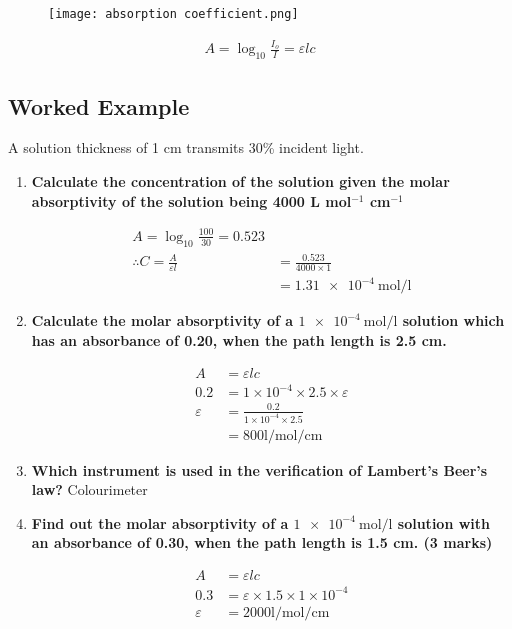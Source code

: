 	\begin{figure}[H]
		\centering
		\texttt{[image: absorption coefficient.png]}
	\end{figure}

	\begingroup
		\Large
		\begin{align*}
			A = \log_{10}{\frac{I_o}{I}} = \varepsilon lc
		\end{align*}
	\endgroup

	\newpage

	\subsection{Worked Example}
		A solution thickness of 1 cm transmits 30\% incident light.
		\begin{enumerate}
			\item \textbf{Calculate the concentration of the solution given the molar absorptivity of the solution being 4000 L mol$^{-1}$ cm$^{-1}$}
			
			\begin{align*}
				A = \log_{10}{\frac{100}{30}} = 0.523 \\
				\therefore C = \frac{A}{\varepsilon l} &= \frac{0.523}{4000 \times 1} \\
				&= \SI{1.31e-4}{\mole\per\litre}
			\end{align*}

			\item \textbf{Calculate the molar absorptivity of a $\SI{1e-4}{\mol\per\litre}$ solution which has an absorbance of 0.20, when the path length is 2.5 cm.}
			
			\begin{align*}
				A &= \varepsilon l c \\
				0.2 &= 1 \times 10^{-4} \times 2.5 \times \varepsilon \\
				\varepsilon &= \frac{0.2}{1 \times 10^{-4} \times 2.5} \\
				&= {800} \unit{\litre\per\mole\per\cm}
			\end{align*}

			\item \textbf{Which instrument is used in the verification of Lambert's Beer's law?}
			\subitem Colourimeter

			\item \textbf{Find out the molar absorptivity of a $\SI{1e-4}{\mole\per\litre}$ solution with an absorbance of 0.30, when the path length is 1.5 cm. (3 marks)}
			
			\begin{align*}
				A &= \varepsilon lc \\
				0.3 &= \varepsilon \times 1.5 \times 1 \times 10^{-4} \\
				\varepsilon &= 2000 \unit{\litre\per\mole\per\cm}
			\end{align*}
		\end{enumerate}

